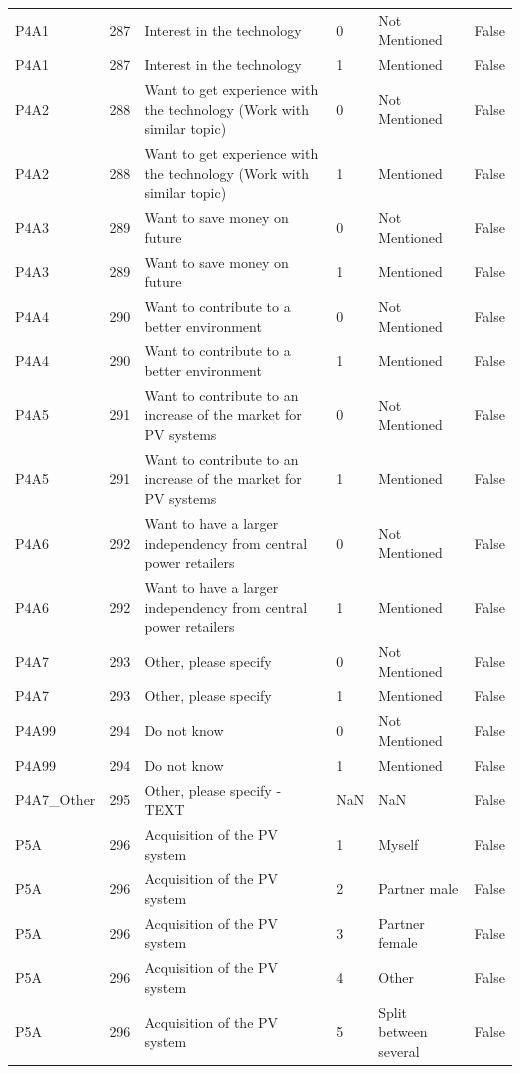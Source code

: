 \begin{tabular}{lrlllr}
P4A1 & 287 & Interest in the technology & 0 & Not Mentioned & False \\
P4A1 & 287 & Interest in the technology & 1 & Mentioned & False \\
P4A2 & 288 & Want to get experience with the technology (Work with similar topic) & 0 & Not Mentioned & False \\
P4A2 & 288 & Want to get experience with the technology (Work with similar topic) & 1 & Mentioned & False \\
P4A3 & 289 & Want to save money on future & 0 & Not Mentioned & False \\
P4A3 & 289 & Want to save money on future & 1 & Mentioned & False \\
P4A4 & 290 & Want to contribute to a better environment & 0 & Not Mentioned & False \\
P4A4 & 290 & Want to contribute to a better environment & 1 & Mentioned & False \\
P4A5 & 291 & Want to contribute to an increase of the market for PV systems & 0 & Not Mentioned & False \\
P4A5 & 291 & Want to contribute to an increase of the market for PV systems & 1 & Mentioned & False \\
P4A6 & 292 & Want to have a larger independency from central power retailers & 0 & Not Mentioned & False \\
P4A6 & 292 & Want to have a larger independency from central power retailers & 1 & Mentioned & False \\
P4A7 & 293 & Other, please specify & 0 & Not Mentioned & False \\
P4A7 & 293 & Other, please specify & 1 & Mentioned & False \\
P4A99 & 294 & Do not know & 0 & Not Mentioned & False \\
P4A99 & 294 & Do not know & 1 & Mentioned & False \\
P4A7_Other & 295 & Other, please specify - TEXT & NaN & NaN & False \\
P5A & 296 & Acquisition of the PV system & 1 & Myself & False \\
P5A & 296 & Acquisition of the PV system & 2 & Partner male & False \\
P5A & 296 & Acquisition of the PV system & 3 & Partner female & False \\
P5A & 296 & Acquisition of the PV system & 4 & Other & False \\
P5A & 296 & Acquisition of the PV system & 5 & Split between several & False \\

\end{tabular}
